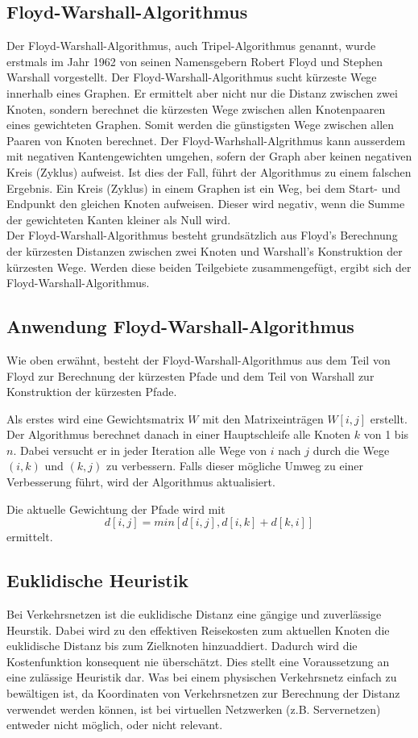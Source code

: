 \subsection{Floyd-Warshall-Algorithmus}
Der Floyd-Warshall-Algorithmus, auch Tripel-Algorithmus genannt, wurde erstmals im Jahr 1962 von seinen Namensgebern Robert Floyd und Stephen Warshall vorgestellt.
Der Floyd-Warshall-Algorithmus sucht kürzeste Wege innerhalb eines Graphen. Er ermittelt aber nicht nur die Distanz zwischen zwei Knoten, sondern berechnet die kürzesten Wege zwischen allen Knotenpaaren eines gewichteten Graphen. Somit werden die günstigsten Wege zwischen allen Paaren von Knoten berechnet. Der Floyd-Warhshall-Algrithmus kann ausserdem mit negativen Kantengewichten umgehen, sofern der Graph aber keinen negativen Kreis (Zyklus) aufweist. Ist dies der Fall, führt der Algorithmus zu einem falschen Ergebnis.
Ein Kreis (Zyklus) in einem Graphen ist ein Weg, bei dem Start- und Endpunkt den gleichen Knoten aufweisen. Dieser wird negativ, wenn die Summe der gewichteten Kanten kleiner als Null wird.\\
Der Floyd-Warshall-Algorithmus besteht grundsätzlich aus Floyd's Berechnung der kürzesten Distanzen zwischen zwei Knoten und Warshall's Konstruktion der kürzesten Wege. Werden diese beiden Teilgebiete zusammengefügt, ergibt sich der Floyd-Warshall-Algorithmus.

\subsection{Anwendung Floyd-Warshall-Algorithmus}

Wie oben erwähnt, besteht der Floyd-Warshall-Algorithmus aus dem Teil von Floyd zur Berechnung der kürzesten Pfade und dem Teil von Warshall zur Konstruktion der kürzesten Pfade.

Als erstes wird eine Gewichtsmatrix $W$ mit den Matrixeinträgen $W[i, j]$ erstellt.
Der Algorithmus berechnet danach in einer Hauptschleife alle Knoten $k$ von 1 bis $n$.
Dabei versucht er in jeder Iteration alle Wege von $i$ nach $j$ durch die Wege $(i, k)$ und $(k, j)$ zu verbessern.
Falls dieser mögliche Umweg zu einer Verbesserung führt, wird der Algorithmus aktualisiert.

Die aktuelle Gewichtung der Pfade wird mit
\begin{equation}d[i, j]=min[d[i,j], d[i,k] + d[k,i]]\end{equation}
ermittelt.

\subsection{Euklidische Heuristik}
Bei Verkehrsnetzen ist die euklidische Distanz eine gängige und zuverlässige Heurstik. Dabei wird zu den effektiven Reisekosten zum aktuellen Knoten die euklidische Distanz bis zum Zielknoten hinzuaddiert. Dadurch wird die Kostenfunktion konsequent nie überschätzt. Dies stellt eine Voraussetzung an eine zulässige Heuristik dar.
Was bei einem physischen Verkehrsnetz einfach zu bewältigen ist, da Koordinaten von Verkehrsnetzen zur Berechnung der Distanz verwendet werden können, ist bei virtuellen Netzwerken (z.B. Servernetzen) entweder nicht möglich, oder nicht relevant.

